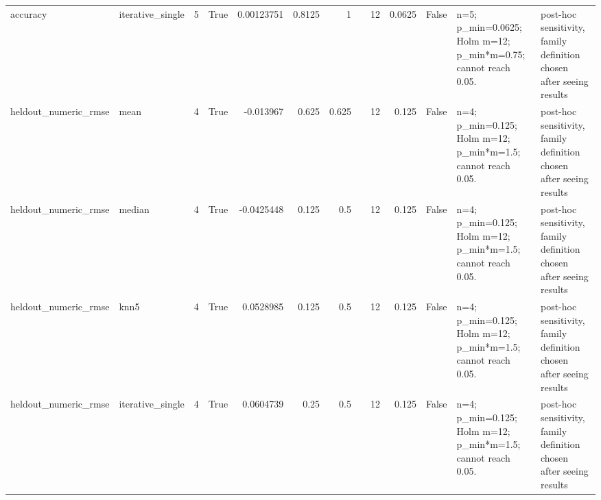 \begin{table}[ht]
{\begin{tabular}{llrlrrrlrrlll}
 accuracy                       & iterative\_single &            5 & True                &      0.00123751  &    0.8125 &   1      &                                                                                                                    &                             12 &                             0.0625 & False                       & n=5; p\_min=0.0625; Holm m=12; p\_min*m=0.75; cannot reach 0.05. & post-hoc sensitivity, family definition chosen after seeing results \\
 heldout\_numeric\_rmse           & mean             &            4 & True                &     -0.013967    &    0.625  &   0.625  &                                                                                                                    &                             12 &                             0.125  & False                       & n=4; p\_min=0.125; Holm m=12; p\_min*m=1.5; cannot reach 0.05.   & post-hoc sensitivity, family definition chosen after seeing results \\
 heldout\_numeric\_rmse           & median           &            4 & True                &     -0.0425448   &    0.125  &   0.5    &                                                                                                                    &                             12 &                             0.125  & False                       & n=4; p\_min=0.125; Holm m=12; p\_min*m=1.5; cannot reach 0.05.   & post-hoc sensitivity, family definition chosen after seeing results \\
 heldout\_numeric\_rmse           & knn5             &            4 & True                &      0.0528985   &    0.125  &   0.5    &                                                                                                                    &                             12 &                             0.125  & False                       & n=4; p\_min=0.125; Holm m=12; p\_min*m=1.5; cannot reach 0.05.   & post-hoc sensitivity, family definition chosen after seeing results \\
 heldout\_numeric\_rmse           & iterative\_single &            4 & True                &      0.0604739   &    0.25   &   0.5    &                                                                                                                    &                             12 &                             0.125  & False                       & n=4; p\_min=0.125; Holm m=12; p\_min*m=1.5; cannot reach 0.05.   & post-hoc sensitivity, family definition chosen after seeing results \\

\end{tabular}}
\end{table}
